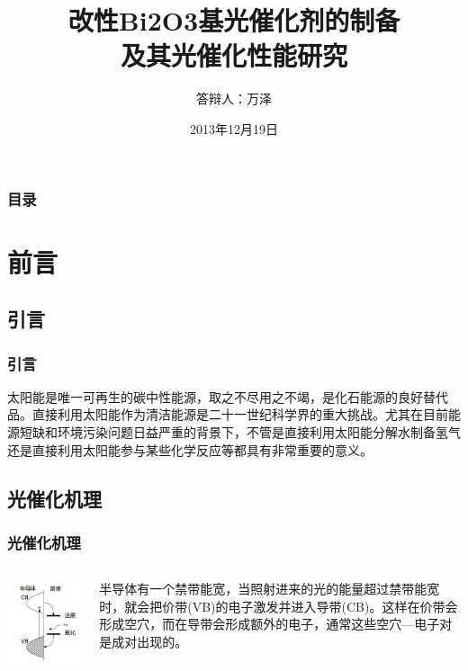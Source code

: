 \documentclass[xetex,compress]{mybeamer}
\title{改性Bi{\scriptsize 2}O{\scriptsize 3}基光催化剂的制备\\[10pt]及其光催化性能研究}
\author{答辩人：万泽}
\institute{指导教师：李建章 教授}
\date{2013年12月19日}
\begin{document}
\begin{frame}
\titlepage
\end{frame}


\begin{frame}
\frametitle{目录}
\setcounter{tocdepth}{1}
\tableofcontents[pausesections]%
\end{frame}


\section{前言}%
\subsection{引言}
\begin{frame}
\frametitle{引言}
\begin{block}{}
太阳能是唯一可再生的碳中性能源，取之不尽用之不竭，是化石能源的良好替代品。直接利用太阳能作为清洁能源是二十一世纪科学界的重大挑战。尤其在目前能源短缺和环境污染问题日益严重的背景下，不管是直接利用太阳能分解水制备氢气还是直接利用太阳能参与某些化学反应等都具有非常重要的意义。
\end{block}
\end{frame}


\subsection{光催化机理}
\begin{frame}
\frametitle{光催化机理}
\begin{columns}
\begin{block}{}
\centering
\includegraphics[scale=0.6]{figures/光催化机理图} 
\end{block}
\begin{block}{}
半导体有一个禁带能宽，当照射进来的光的能量超过禁带能宽时，就会把价带(VB)的电子激发并进入导带(CB)。这样在价带会形成空穴，而在导带会形成额外的电子，通常这些空穴—电子对是成对出现的。
\end{block}
\end{columns}
\end{frame}
\end{document}

